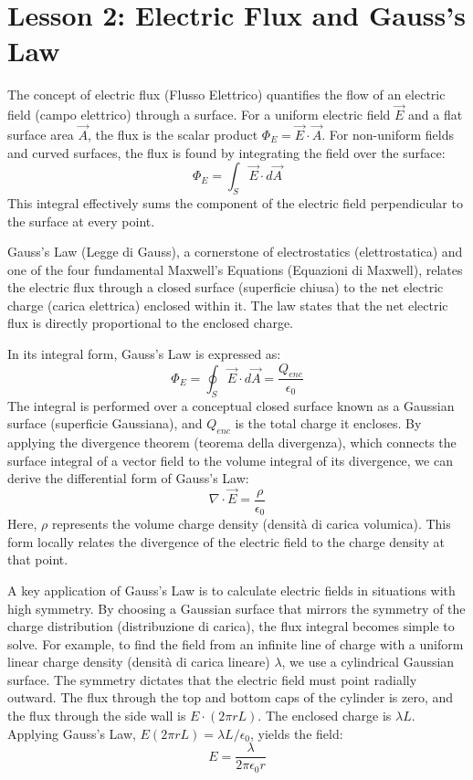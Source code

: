 \section*{Lesson 2: Electric Flux and Gauss's Law}

The concept of electric flux (Flusso Elettrico) quantifies the flow of an electric field (campo elettrico) through a surface. For a uniform electric field \(\vec{E}\) and a flat surface area \(\vec{A}\), the flux is the scalar product \(\Phi_E = \vec{E} \cdot \vec{A}\). For non-uniform fields and curved surfaces, the flux is found by integrating the field over the surface:
\begin{equation}
    \Phi_E = \int_S \vec{E} \cdot d\vec{A}
\end{equation}
This integral effectively sums the component of the electric field perpendicular to the surface at every point.

Gauss's Law (Legge di Gauss), a cornerstone of electrostatics (elettrostatica) and one of the four fundamental Maxwell's Equations (Equazioni di Maxwell), relates the electric flux through a closed surface (superficie chiusa) to the net electric charge (carica elettrica) enclosed within it. The law states that the net electric flux is directly proportional to the enclosed charge.

In its integral form, Gauss's Law is expressed as:
\begin{equation}
    \Phi_E = \oint_S \vec{E} \cdot d\vec{A} = \frac{Q_{enc}}{\epsilon_0}
\end{equation}
The integral is performed over a conceptual closed surface known as a Gaussian surface (superficie Gaussiana), and \(Q_{enc}\) is the total charge it encloses. By applying the divergence theorem (teorema della divergenza), which connects the surface integral of a vector field to the volume integral of its divergence, we can derive the differential form of Gauss's Law:
\begin{equation}
    \nabla \cdot \vec{E} = \frac{\rho}{\epsilon_0}
\end{equation}
Here, \(\rho\) represents the volume charge density (densità di carica volumica). This form locally relates the divergence of the electric field to the charge density at that point.

A key application of Gauss's Law is to calculate electric fields in situations with high symmetry. By choosing a Gaussian surface that mirrors the symmetry of the charge distribution (distribuzione di carica), the flux integral becomes simple to solve. For example, to find the field from an infinite line of charge with a uniform linear charge density (densità di carica lineare) \(\lambda\), we use a cylindrical Gaussian surface. The symmetry dictates that the electric field must point radially outward. The flux through the top and bottom caps of the cylinder is zero, and the flux through the side wall is \(E \cdot (2\pi r L)\). The enclosed charge is \(\lambda L\). Applying Gauss's Law, \(E (2\pi r L) = \lambda L / \epsilon_0\), yields the field:
\begin{equation}
    E = \frac{\lambda}{2\pi\epsilon_0 r}
\end{equation}